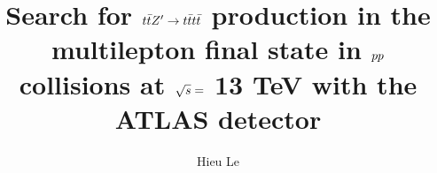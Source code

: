\documentclass{msuphddissertation}
\author{Hieu Le} %
\title{Search for $\lowercase{\ttbar}Z' \rightarrow \lowercase{\tttt}$ production in the multilepton final state in $\lowercase{pp}$ collisions at \lowercase{$\sqrt{s}=$} 13 TeV with the ATLAS detector} %
\begin{document}
\maketitlepage %


\begin{abstract}


\end{abstract}
\end{document}
